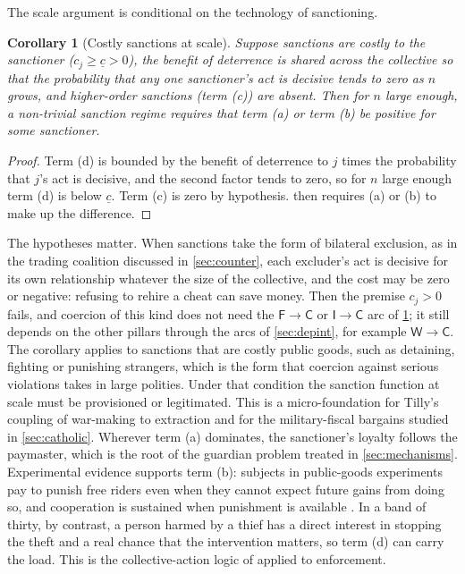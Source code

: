 \documentclass[11pt,letterpaper]{article}
\newtheorem{corollary}[theorem]{Corollary}
\theoremstyle{definition}
\theoremstyle{remark}
\newcommand{\pF}{\mathsf{F}}
\newcommand{\pI}{\mathsf{I}}
\newcommand{\pC}{\mathsf{C}}
\newcommand{\pW}{\mathsf{W}}
\begin{document}
The scale argument is conditional on the technology of sanctioning.

\begin{corollary}[Costly sanctions at scale]
\label{cor:coercive-power:scale}
Suppose sanctions are costly to the sanctioner ($c_j \ge \underline{c} > 0$), the benefit of deterrence is shared across the collective so that the probability that any one sanctioner's act is decisive tends to zero as $n$ grows, and higher-order sanctions (term (c)) are absent. Then for $n$ large enough, a non-trivial sanction regime requires that term (a) or term (b) be positive for some sanctioner.
\end{corollary}

\begin{proof}
Term (d) is bounded by the benefit of deterrence to $j$ times the probability that $j$'s act is decisive, and the second factor tends to zero, so for $n$ large enough term (d) is below $\underline{c}$. Term (c) is zero by hypothesis.  then requires (a) or (b) to make up the difference.
\end{proof}

The hypotheses matter. When sanctions take the form of bilateral exclusion, as in the trading coalition discussed in \cref{sec:counter}, each excluder's act is decisive for its own relationship whatever the size of the collective, and the cost may be zero or negative: refusing to rehire a cheat can save money. Then the premise $c_j > 0$ fails, and coercion of this kind does not need the $\pF \to \pC$ or $\pI \to \pC$ arc of \cref{cor:coercive-power:scale}; it still depends on the other pillars through the arcs of \cref{sec:depint}, for example $\pW \to \pC$. The corollary applies to sanctions that are costly public goods, such as detaining, fighting or punishing strangers, which is the form that coercion against serious violations takes in large polities. Under that condition the sanction function at scale must be provisioned or legitimated. This is a micro-foundation for Tilly's coupling of war-making to extraction \citep{tilly1990} and for the military-fiscal bargains studied in \cref{sec:catholic}. Wherever term (a) dominates, the sanctioner's loyalty follows the paymaster, which is the root of the guardian problem treated in \cref{sec:mechanisms}. Experimental evidence supports term (b): subjects in public-goods experiments pay to punish free riders even when they cannot expect future gains from doing so, and cooperation is sustained when punishment is available \citep{fehr2002}. In a band of thirty, by contrast, a person harmed by a thief has a direct interest in stopping the theft and a real chance that the intervention matters, so term (d) can carry the load. This is the collective-action logic of \citet{olson1965} applied to enforcement.
\end{document}
